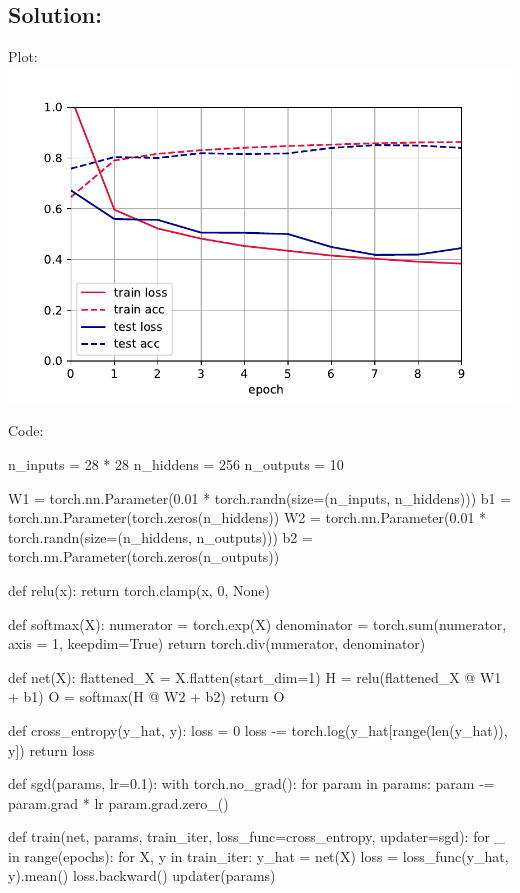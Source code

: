 \documentclass[submit]{harvardml}
\begin{document}
\subsection*{Solution:}
Plot:\\
\includegraphics[width=\linewidth]{final_plot}

Code:

\begin{python}
n_inputs = 28 * 28
n_hiddens = 256
n_outputs = 10

W1 = torch.nn.Parameter(0.01 * torch.randn(size=(n_inputs, n_hiddens)))
b1 = torch.nn.Parameter(torch.zeros(n_hiddens))
W2 = torch.nn.Parameter(0.01 * torch.randn(size=(n_hiddens, n_outputs)))
b2 = torch.nn.Parameter(torch.zeros(n_outputs))



def relu(x):
    return torch.clamp(x, 0, None)



def softmax(X):
    numerator = torch.exp(X)
    denominator = torch.sum(numerator, axis = 1, keepdim=True)
    return torch.div(numerator, denominator)



def net(X):
    flattened_X = X.flatten(start_dim=1)
    H = relu(flattened_X @ W1 + b1)
    O = softmax(H @ W2 + b2)
    return O



def cross_entropy(y_hat, y):
    loss = 0
    loss -= torch.log(y_hat[range(len(y_hat)), y])
    return loss



def sgd(params, lr=0.1):
    with torch.no_grad():
        for param in params:
            param -= param.grad * lr
            param.grad.zero_()



def train(net, params, train_iter, loss_func=cross_entropy, updater=sgd):
    for _ in range(epochs):
        for X, y in train_iter:
            y_hat = net(X)
            loss = loss_func(y_hat, y).mean()
            loss.backward()
            updater(params)

\end{python}
\end{document}
